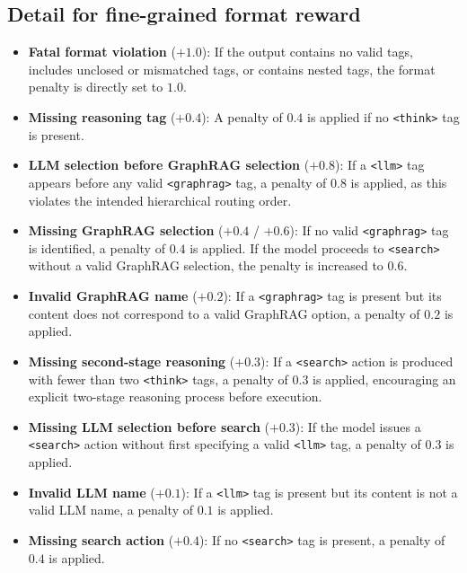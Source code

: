 \subsection{Detail for fine-grained format reward}
\label{app:format}
\begin{itemize}[leftmargin=*,itemsep=2pt,topsep=2pt]
    \item \textbf{Fatal format violation} (\(+1.0\)): If the output contains no valid tags, includes unclosed or mismatched tags, or contains nested tags, the format penalty is directly set to \(1.0\).

    \item \textbf{Missing reasoning tag} (\(+0.4\)): A penalty of \(0.4\) is applied if no \texttt{<think>} tag is present.

    \item \textbf{LLM selection before GraphRAG selection} (\(+0.8\)): If a \texttt{<llm>} tag appears before any valid \texttt{<graphrag>} tag, a penalty of \(0.8\) is applied, as this violates the intended hierarchical routing order.

    \item \textbf{Missing GraphRAG selection} (\(+0.4\) / \(+0.6\)): If no valid \texttt{<graphrag>} tag is identified, a penalty of \(0.4\) is applied. If the model proceeds to \texttt{<search>} without a valid GraphRAG selection, the penalty is increased to \(0.6\).

    \item \textbf{Invalid GraphRAG name} (\(+0.2\)): If a \texttt{<graphrag>} tag is present but its content does not correspond to a valid GraphRAG option, a penalty of \(0.2\) is applied.

    \item \textbf{Missing second-stage reasoning} (\(+0.3\)): If a \texttt{<search>} action is produced with fewer than two \texttt{<think>} tags, a penalty of \(0.3\) is applied, encouraging an explicit two-stage reasoning process before execution.

    \item \textbf{Missing LLM selection before search} (\(+0.3\)): If the model issues a \texttt{<search>} action without first specifying a valid \texttt{<llm>} tag, a penalty of \(0.3\) is applied.

    \item \textbf{Invalid LLM name} (\(+0.1\)): If a \texttt{<llm>} tag is present but its content is not a valid LLM name, a penalty of \(0.1\) is applied.

    \item \textbf{Missing search action} (\(+0.4\)): If no \texttt{<search>} tag is present, a penalty of \(0.4\) is applied.


\end{itemize}
